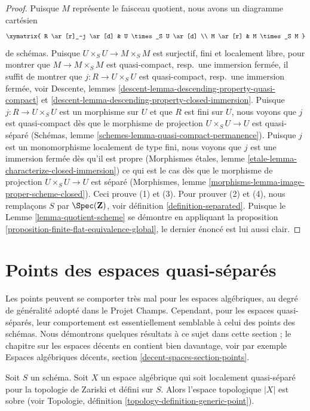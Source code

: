 \begin{proof}
Puisque $M$ représente le faisceau quotient, nous avons un diagramme cartésien
$$
\xymatrix{
R \ar[r]_-j \ar[d] & U \times_S U \ar[d] \\
M \ar[r] & M \times_S M
}
$$
de schémas. Puisque $U \times_S U \to M \times_S M$ est surjectif, fini et localement
libre, pour montrer que $M \to M \times_S M$ est quasi-compact, resp.\ une
immersion fermée, il suffit de montrer que $j : R \to U \times_S U$ est
quasi-compact, resp.\ une immersion fermée, voir
Descente, lemmes \ref{descent-lemma-descending-property-quasi-compact} et
\ref{descent-lemma-descending-property-closed-immersion}.
Puisque $j : R \to U \times_S U$ est un morphisme sur $U$ et que
$R$ est fini sur $U$, nous voyons que $j$ est quasi-compact dès que
le morphisme de projection $U \times_S U \to U$ est quasi-séparé
(Schémas, lemme \ref{schemes-lemma-quasi-compact-permanence}).
Puisque $j$ est un monomorphisme localement de type fini, nous voyons que
$j$ est une immersion fermée dès qu'il est propre
(Morphismes \'etales, lemme \ref{etale-lemma-characterize-closed-immersion})
ce qui est le cas dès que le morphisme de projection
$U \times_S U \to U$ est séparé
(Morphismes, lemme \ref{morphisms-lemma-image-proper-scheme-closed}).
Ceci prouve (1) et (3). Pour prouver (2) et (4), nous remplaçons $S$ par
$\Spec(\mathbf{Z})$, voir définition \ref{definition-separated}.
Puisque le Lemme \ref{lemma-quotient-scheme} se démontre en appliquant la
proposition \ref{proposition-finite-flat-equivalence-global},
le dernier énoncé est lui aussi clair.
\end{proof}




\section{Points des espaces quasi-séparés}
\label{section-points-quasi-separated}

\noindent
Les points peuvent se comporter très mal pour les espaces algébriques, au degré de généralité adopté
dans le Projet Champs. Cependant, pour les espaces quasi-séparés, leur comportement
est essentiellement semblable à celui des points des schémas. Nous démontrons quelques résultats
à ce sujet dans cette section ; le chapitre sur les espaces décents en contient bien davantage,
voir par exemple
Espaces algébriques décents, section \ref{decent-spaces-section-points}.

\begin{lemma}
\label{lemma-quasi-separated-sober}
Soit $S$ un schéma. Soit $X$ un espace algébrique qui soit localement
quasi-séparé pour la topologie de Zariski et défini sur $S$. Alors l'espace topologique $|X|$ est sobre (voir
Topologie, définition \ref{topology-definition-generic-point}).
\end{lemma}

